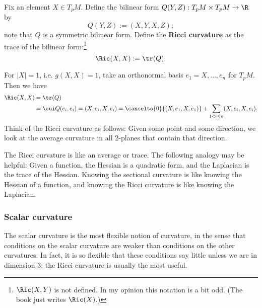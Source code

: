\begin{df}
Fix an element $X\in T_pM$. %
Define the bilinear form $Q(Y,Z):T_pM\times T_pM\to \R$ by
\[
Q(Y,Z):=(X,Y,X,Z);
\]
note that $Q$ is a symmetric bilinear form. %
Define the \textbf{Ricci curvature} as the trace of the bilinear form:\footnote{$\Ric(X,Y)$ is not defined. In my opinion this notation is a bit odd. (The book just writes $\Ric(X)$.)}
\[\Ric(X,X):=\tr(Q).\]
\end{df}
For $|X|=1$, i.e. $g(X,X)=1$, take an orthonormal basis $e_1=X,\ldots, e_n$ for $T_pM$. Then we have
\begin{align*}
\Ric(X,X)&=\tr(Q)\\
&=\sui Q(e_i,e_i)=(X,e_i,X,e_i)=\cancelto{0}{(X,e_1,X,e_1)}+\sum_{1<i\le n} (X,e_i,X,e_i).
\end{align*}
Think of the Ricci curvature as follows: Given some point and some direction, we look at the average curvature in all 2-planes that contain that direction. %

The Ricci curvature is like an average or trace. The following analogy may be helpful: Given a function, the Hessian is a quadratic form, and the Laplacian is the trace of the Hessian. Knowing the sectional curvature is like knowing the Hessian of a function, and knowing the Ricci curvature is like knowing the Laplacian.

\subsubsection{Scalar curvature}
The scalar curvature is the most flexible notion of curvature, in the sense that conditions on the scalar curvature are weaker than conditions on the other curvatures. In fact, it is so flexible that these conditions say little unless we are in dimension 3; the Ricci curvature is usually the most useful.


